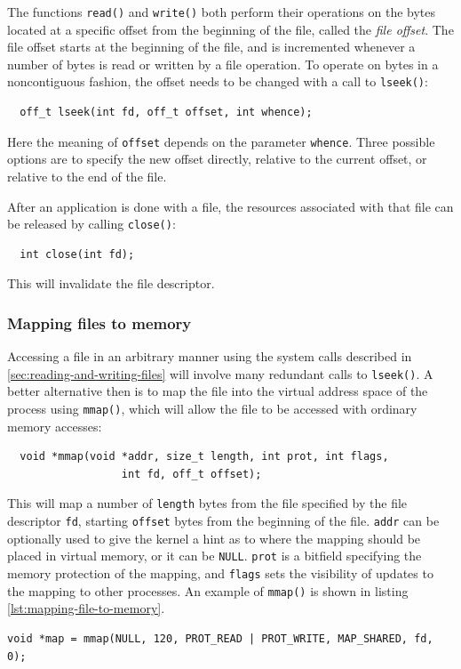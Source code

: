 The functions \texttt{read()} and \texttt{write()} both perform their operations on the bytes located at a specific offset from the beginning of the file, called the \emph{file offset}. The file offset starts at the beginning of the file, and is incremented whenever a number of bytes is read or written by a file operation. To operate on bytes in a noncontiguous fashion, the offset needs to be changed with a call to \texttt{lseek()}:
\begin{verbatim}
  off_t lseek(int fd, off_t offset, int whence);
\end{verbatim}
Here the meaning of \texttt{offset} depends on the parameter \texttt{whence}. Three possible options are to specify the new offset directly, relative to the current offset, or relative to the end of the file.

After an application is done with a file, the resources associated with that file can be released by calling \texttt{close()}:
\begin{verbatim}
  int close(int fd);
\end{verbatim}
This will invalidate the file descriptor.\cite{linux-man-pages}


\subsubsection{Mapping files to memory}\label{mapping-files-to-memory}
Accessing a file in an arbitrary manner using the system calls described in \ref{sec:reading-and-writing-files} will involve many redundant calls to \texttt{lseek()}. A better alternative then is to map the file into the virtual address space of the process using \texttt{mmap()}, which will allow the file to be accessed with ordinary memory accesses:
\begin{verbatim}
  void *mmap(void *addr, size_t length, int prot, int flags,
                  int fd, off_t offset);
\end{verbatim}
This will map a number of \texttt{length} bytes from the file specified by the file descriptor \texttt{fd}, starting 
\texttt{offset} bytes from the beginning of the file. \texttt{addr} can be optionally used to give the kernel a hint as to where the mapping should be placed in virtual memory, or it can be \texttt{NULL}. \texttt{prot} is a bitfield specifying the memory protection of the mapping, and \texttt{flags} sets the visibility of updates to the mapping to other processes. An example of \texttt{mmap()} is shown in listing \ref{lst:mapping-file-to-memory}.
\lstset{style=lststyle-c}
\begin{lstlisting}[caption=Mapping the first 120 bytes of a file to memory,label=lst:mapping-file-to-memory]
void *map = mmap(NULL, 120, PROT_READ | PROT_WRITE, MAP_SHARED, fd, 0);
\end{lstlisting}


